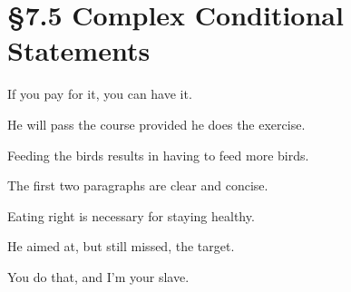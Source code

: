 % 
% 

\section{\S 7.5 Complex Conditional Statements}
\begin{enumerate}

\begin{statement}{If you pay for it, you can have it.}
\end{statement}

\begin{statement}{He will pass the course provided he does the exercise.}
\end{statement}

\begin{statement}{Feeding the birds results in having to feed more birds.}
\end{statement}

\begin{statement}{The first two paragraphs are clear and concise.}
\end{statement}

\begin{statement}{Eating right is necessary for staying healthy.}
\end{statement}

\begin{statement}{He aimed at, but still missed, the target.}
\end{statement}

\begin{statement}{You do that, and I’m your slave.}
\end{statement}


\end{enumerate}
